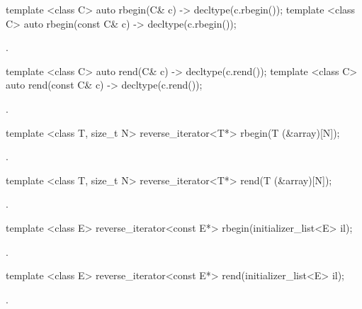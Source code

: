 {%
\begin{itemdecl}
template <class C> auto rbegin(C& c) -> decltype(c.rbegin());
template <class C> auto rbegin(const C& c) -> decltype(c.rbegin());
\end{itemdecl}
\begin{itemdescr}
\pnum \returns {}.
\end{itemdescr}

%
\begin{itemdecl}
template <class C> auto rend(C& c) -> decltype(c.rend());
template <class C> auto rend(const C& c) -> decltype(c.rend());
\end{itemdecl}
\begin{itemdescr}
\pnum \returns {}.
\end{itemdescr}

%
\begin{itemdecl}
template <class T, size_t N> reverse_iterator<T*> rbegin(T (&array)[N]);
\end{itemdecl}
\begin{itemdescr}
\pnum \returns {}.
\end{itemdescr}

%
\begin{itemdecl}
template <class T, size_t N> reverse_iterator<T*> rend(T (&array)[N]);
\end{itemdecl}
\begin{itemdescr}
\pnum \returns {}.
\end{itemdescr}

%
\begin{itemdecl}
template <class E> reverse_iterator<const E*> rbegin(initializer_list<E> il);
\end{itemdecl}
\begin{itemdescr}
\pnum \returns {}.
\end{itemdescr}

%
\begin{itemdecl}
template <class E> reverse_iterator<const E*> rend(initializer_list<E> il);
\end{itemdecl}
\begin{itemdescr}
\pnum \returns {}.
\end{itemdescr}

}

